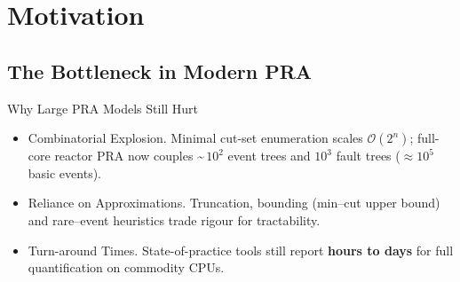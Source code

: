 \section{Motivation}

\subsection{The Bottleneck in Modern PRA}
\begin{frame}[t]{Why Large PRA Models Still Hurt}
  \begin{itemize}
    \item \alert{Combinatorial Explosion.}  Minimal cut-set enumeration scales $\mathcal{O}(2^{n})$; full-core reactor PRA now couples \textasciitilde{}\,$10^{2}$ event trees and $10^{3}$ fault trees ($\approx10^{5}$ basic events).
    \item \alert{Reliance on Approximations.}  Truncation, bounding (min–cut upper bound) and rare–event heuristics trade rigour for tractability.
    \item \alert{Turn-around Times.}  State-of-practice tools still report \textbf{hours to days} for full quantification on commodity CPUs.
  \end{itemize}
\end{frame}

